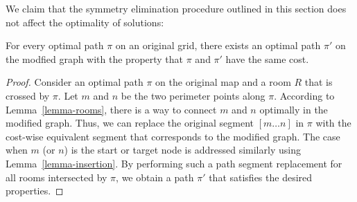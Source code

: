 We claim that the symmetry elimination procedure outlined in this section does not affect the optimality of solutions:
\begin{theorem}
For every optimal path $\pi$ on an original grid, there exists an optimal path $\pi'$ on the modfied graph with the property
that $\pi$ and $\pi'$ have the same cost.
\end{theorem}
\begin{proof}
Consider an optimal path $\pi$ on the original map and a room $R$ that is crossed by $\pi$.
Let $m$ and $n$ be the two perimeter points along $\pi$. According to Lemma~\ref{lemma-rooms},
there is a way to connect $m$ and $n$ optimally in the modified graph. Thus, we can replace the
original segment $[m \dots n]$ in $\pi$ with the cost-wise equivalent segment that corresponds to the modified graph.
The case when $m$ (or $n$) is the start or target node is addressed similarly using Lemma~\ref{lemma-insertion}.
By performing such a path segment replacement for all rooms intersected by $\pi$, we obtain a path $\pi'$
that satisfies the desired properties.
\end{proof}


